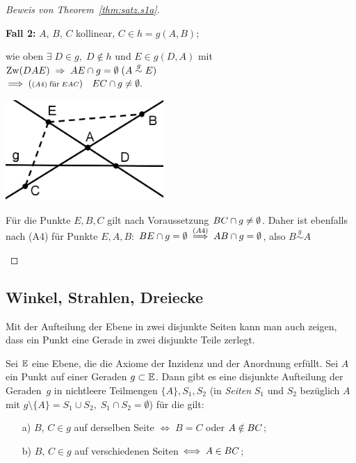 \begin{proof}[Beweis von Theorem~\ref{thm:satz.s1a}]
\begin{itemize}
    {\bf Fall 2:} $A,\,B,\,C$ kollinear, $C\in h=g(A,B)$;

    wie oben $\exists\;D\in g,\;D\notin h$ und $E\in g(D,A)$ mit $\operatorname{Zw}(DAE)\;\Rightarrow\;
    {AE}\cap g=\emptyset\;(A\stackrel{g}{\sim} E)$\\
    $\Longrightarrow\;({\scriptstyle (A4)\;\mbox{\footnotesize
        f\"{u}r}\; EAC})
    \quad{EC}\cap g\neq\emptyset.$

\centerline{\includegraphics[width=6cm]{BILDER/1-1-06f-Seiten.png}}


Für die Punkte $E,B,C$ gilt nach Voraussetzung ${BC}\cap g\neq\emptyset$.
Daher ist ebenfalls nach (A4) für Punkte $E,A,B$: ${BE}\cap g=\emptyset
\;\stackrel{(A4)}{\Longrightarrow}\;{AB}\cap g=\emptyset$,
also $B\stackrel{g}{\sim} A$

\end{itemize}

\end{proof}












\subsection*{Winkel, Strahlen, Dreiecke}


Mit der Aufteilung der Ebene in zwei disjunkte Seiten kann man auch zeigen, 
dass ein Punkt eine Gerade in zwei disjunkte Teile zerlegt.


\begin{thm}\label{thm:satz.s1b}
Sei $\mathbb E$ eine Ebene, die die Axiome der Inzidenz und der
Anordnung erfüllt.
Sei $A$ ein Punkt auf einer Geraden $g\subset\mathbb E$.
Dann gibt es eine disjunkte Aufteilung der Geraden~$g$ in nichtleere Teilmengen $\{A\}, S_1, S_2$
(in {\em Seiten} $S_1$ und $S_2$ bezüglich $A$ mit $g\setminus \{A\}=S_1\cup S_2,\;S_1\cap S_2=\emptyset$)
für die gilt:
\begin{enumerate}
    \item[a)] $B,\,C\in g$ auf \glqq{}derselben Seite\grqq{} $\Longleftrightarrow\;
        B=C$ oder $A\notin{BC}$;
    \item[b)] $B,\,C\in g$ auf \glqq{}verschiedenen Seiten\grqq{}
    $\Longleftrightarrow\;A\in{BC}$;
\end{enumerate}
\end{thm}

